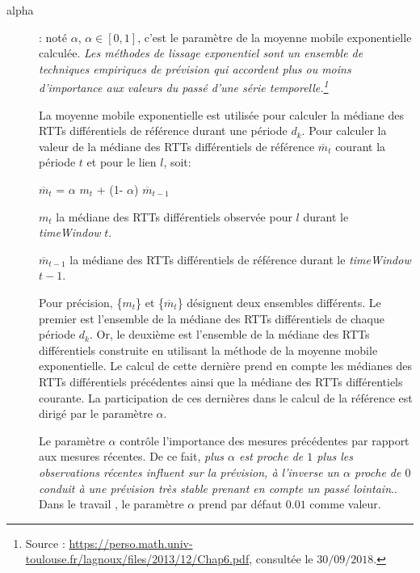 \begin{description}
\item[alpha ]: noté $\alpha$,  $\alpha \in [0, 1]$, c'est le paramètre de la  moyenne mobile exponentielle calculée.
\guillemotleft \textit{ Les méthodes de lissage exponentiel  sont un ensemble de techniques empiriques de prévision qui accordent plus ou moins d'importance aux valeurs du passé d'une série temporelle.\footnote{Source : \url{https://perso.math.univ-toulouse.fr/lagnoux/files/2013/12/Chap6.pdf}, consultée le $30/09/2018.$}} \guillemotright

 La  moyenne mobile exponentielle est utilisée pour calculer la médiane des RTTs différentiels de référence durant une période $d_k$.
Pour calculer la  valeur de la médiane des RTTs différentiels de référence $ \overline{m}_{t}$   courant la période $ t $ et pour le lien $l$, soit:

\begin{center}
	$ \overline{m}_{t}$ =  $\alpha$ ${m}_{t}$ + (1-  $\alpha$) $ \overline{m}_{t-1}$
\end{center} 

$m_t$ la médiane des RTTs différentiels observée pour $l$ durant le \textit{timeWindow} $t$. 

$ \overline{m}_{t-1}$  la médiane des  RTTs différentiels  de référence durant le \textit{timeWindow} $ t-1 $.  



Pour précision, \{$m_t$\} et \{$ \overline{m}_{t}$\} désignent deux ensembles différents. Le premier est l'ensemble de la médiane des RTTs différentiels de chaque période $d_k$. Or, le deuxième est l'ensemble de la médiane des RTTs différentiels construite en utilisant la méthode de la moyenne mobile exponentielle. Le calcul de cette dernière prend en compte les médianes des RTTs différentiels précédentes ainsi que la médiane des RTTs différentiels courante. La participation de ces dernières dans le calcul de la référence est dirigé par le paramètre $\alpha$. 



Le paramètre $\alpha$  contrôle l'importance  des mesures précédentes par rapport aux mesures récentes. De ce fait, \guillemotleft \textit{plus $\alpha$ est proche de $ 1 $ plus les observations récentes influent sur la prévision, à l'inverse un $\alpha$ proche de $0$ conduit à une prévision très stable prenant en compte un passé lointain}.\guillemotright\cite{Lissages-Exponentiels}.  Dans le travail \cite{DBLP:journals/corr/FontugneAPB16}, le paramètre $\alpha$  prend par défaut $0.01$ comme valeur.



\end{description}
